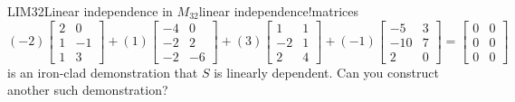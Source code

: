 \begin{example}{LIM32}{Linear independence in $M_{32}$}{linear independence!matrices}
%
\begin{equation*}
(-2)\begin{bmatrix}
2 & 0\\ 1 & -1\\ 1 & 3
\end{bmatrix}+
(1)\begin{bmatrix}
-4 & 0\\ -2 & 2\\ -2 & -6
\end{bmatrix}+
(3)\begin{bmatrix}
1 & 1\\ -2 & 1\\ 2 & 4
\end{bmatrix}+
(-1)\begin{bmatrix}
-5 & 3\\ -10 & 7\\ 2 & 0
\end{bmatrix}
=
\begin{bmatrix}
0&0\\0&0\\0&0
\end{bmatrix}
\end{equation*}
%
is an iron-clad demonstration that $S$ is linearly dependent.  Can you construct another such demonstration?
%
\end{example}
%
